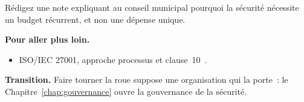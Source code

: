 \begin{boxexo}[title={\ding{45}\quad Exercice~3.10. Note au conseil \niveauexpert}]
Rédigez une note expliquant au conseil municipal pourquoi la sécurité
nécessite un budget récurrent, et non une dépense unique.
\end{boxexo}

\bigskip

\begin{boxinfo}
\textbf{Pour aller plus loin.}
\begin{itemize}
    \item ISO/IEC 27001, approche processus et clause~10~\cite{iso27001}.
\end{itemize}
\end{boxinfo}

\begin{boxinfo}
\textbf{Transition.} Faire tourner la roue suppose une organisation qui la
porte~: le Chapitre~\ref{chap:gouvernance} ouvre la gouvernance de la sécurité.
\end{boxinfo}
